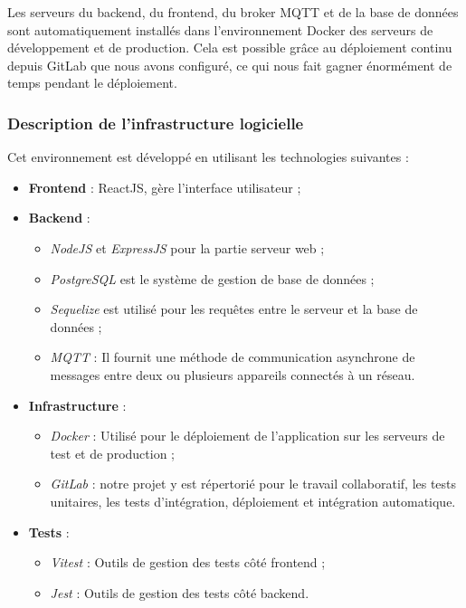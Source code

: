 Les serveurs du backend, du frontend, du broker MQTT et de la base de données sont automatiquement installés dans l'environnement Docker des serveurs de développement et de production.
Cela est possible grâce au déploiement continu depuis GitLab que nous avons configuré, ce qui nous fait gagner énormément de temps pendant le déploiement.


\subsubsection{Description de l'infrastructure logicielle}

Cet environnement est développé en utilisant les technologies suivantes :

\begin{itemize}
	\item \textbf{Frontend} : ReactJS, gère l’interface utilisateur ;
	\item \textbf{Backend} :
	      \begin{itemize}
		      \item \textit{NodeJS} et \textit{ExpressJS} pour la partie serveur web ;
		      \item \textit{PostgreSQL} est le système de gestion de base de données ;
		      \item \textit{Sequelize} est utilisé pour les requêtes entre le serveur et la base de données ;
		      \item \textit{MQTT} : Il fournit une méthode de communication asynchrone de messages entre deux ou plusieurs appareils connectés à un réseau.
	      \end{itemize}
	\item \textbf{Infrastructure} :
	      \begin{itemize}
		      \item \textit{Docker} : Utilisé pour le déploiement de l’application sur les serveurs de test et de production ;
		      \item \textit{GitLab} : notre projet y est répertorié pour le travail collaboratif, les tests unitaires, les tests d’intégration, déploiement et intégration automatique.
	      \end{itemize}
	\item \textbf{Tests} :
	      \begin{itemize}
		      \item \textit{Vitest} : Outils de gestion des tests côté frontend ;
		      \item \textit{Jest} : Outils de gestion des tests côté backend.
	      \end{itemize}
\end{itemize}


